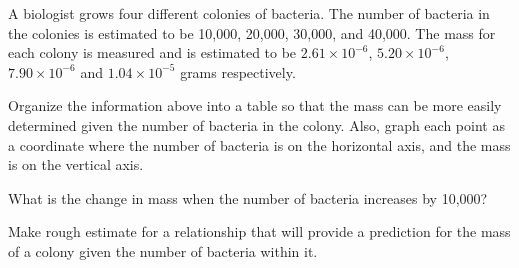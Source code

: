 
\begin{problem}
\item A biologist grows four different colonies of bacteria. The
  number of bacteria in the colonies is estimated to be 10,000,
  20,000, 30,000, and 40,000. The mass for each colony is measured and
  is estimated to be $2.61\times 10^{-6}$, $5.20\times 10^{-6}$,
  $7.90\times 10^{-6}$ and $1.04\times 10^{-5}$ grams respectively.

  Organize the information above into a table so that the mass can be
  more easily determined given the number of bacteria in the
  colony. Also, graph each point as a coordinate where the number of
  bacteria is on the horizontal axis, and the mass is on the vertical
  axis.

  \vfill

\item What is the change in mass when the number of bacteria increases
  by 10,000?

  \vfill

\item Make rough estimate for a relationship that will provide a
  prediction for the mass of a colony given the number of bacteria
  within it.

  \vfill


  \vspace{5em}


\end{problem}



